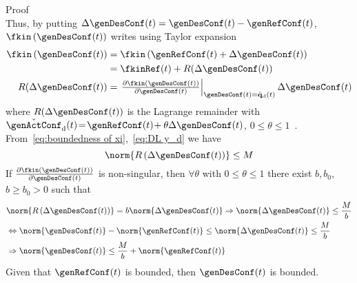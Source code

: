 \begin{custumProof}{Proof}
\begin{equation}
	\end{equation}
	Thus, by putting $\Delta \genDesConf(t)= \genDesConf(t)  - \genRefConf(t)$, $\fkin\left(\genDesConf(t) \right)$  writes using Taylor expansion
	\begin{align}\label{eq:DL y_d}
		\begin{split}
			\fkin\left(\genDesConf(t)\right) &= \fkin\left(\genRefConf(t) + \Delta \genDesConf(t)\right)\\
			&= \fkinRef(t) + R(\Delta \genDesConf(t))\\ R(\Delta \genDesConf(t))&=\left.\begin{matrix}
				\frac{\partial \fkin(\genDesConf(t))}{\partial \genDesConf(t)}
			\end{matrix}\right|_{\genDesConf(t)=\check{\mathbf{q}}_{\mathrm{d}}(t)}\Delta \genDesConf(t)\\ %
		\end{split}
	\end{align} 
	where $R(\Delta \genDesConf(t))$ is the Lagrange remainder with $\check{\genActConf}_{\mathrm{d}}(t)\!=\! \genRefConf(t)\!+\theta\Delta \genDesConf(t)$, $0\leq\theta\leq1$~\cite[Chapter IV, Section 6]{piskunov1969book}.
	From~\cref{eq:boundedness of xi},~\cref{eq:DL y_d} we have
	\begin{equation}
		\norm{R\left(\Delta \genDesConf(t)\right)}\leq M
	\end{equation}
	If $\frac{\partial \fkin(\genDesConf(t))}{\partial \genDesConf(t)}$ is non-singular, then $\forall \theta$ with $0\leq\theta\leq1$ there exist $b,b_0$, $b\geq b_0>0$ such that~\cite{golub2013matrixComputations}
	\begin{align}\label{eq:qd bounded}
		\begin{split}
			& \norm{R\left(\Delta \genDesConf(t)\right)}  = b \norm{\Delta \genDesConf(t)}  \Rightarrow  \norm{\Delta \genDesConf(t)} \leq \frac{M}{b} \\
			&\Leftrightarrow  \norm{\genDesConf(t)}  -  \norm{\genRefConf(t)}  \leq  \norm{\Delta \genDesConf(t)} \leq \frac{M}{b} \\
			&\Rightarrow  \norm{\genDesConf(t)}  \leq \frac{M}{b} + \norm{\genRefConf(t)} 
		\end{split}
	\end{align}
	Given that $\genRefConf(t)$ is bounded, then $\genDesConf(t)$ is bounded.  %
	

\end{custumProof}
